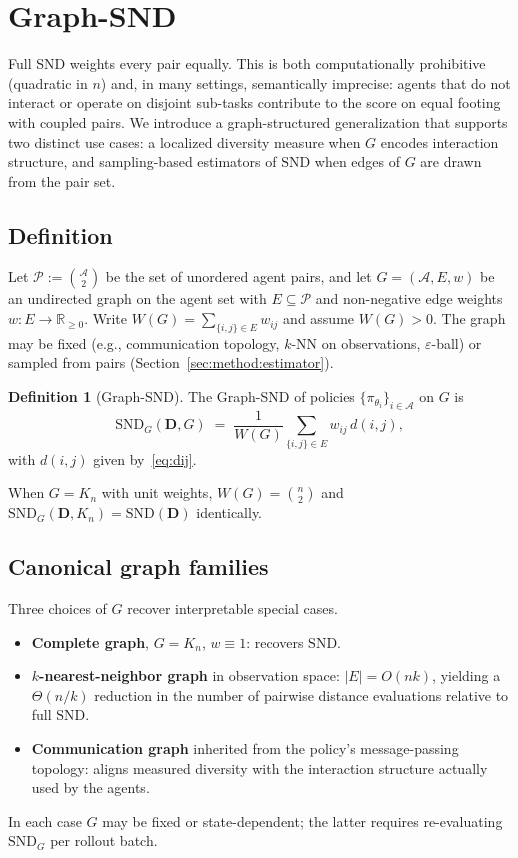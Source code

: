 \documentclass{article}
\theoremstyle{plain}
\theoremstyle{definition}
\newtheorem{definition}[theorem]{Definition}
\theoremstyle{remark}
\newcommand{\R}{\mathbb{R}}
\newcommand{\Agents}{\mathcal{A}}        %
\newcommand{\Pairs}{\mathcal{P}}         %
\newcommand{\policy}[1]{\pi_{\theta_{#1}}}
\newcommand{\SND}{\ensuremath{\mathrm{SND}}}
\newcommand{\SNDG}{\mathrm{SND}_{G}}
\begin{document}
\section{Graph-SND}
\label{sec:method}

Full SND weights every pair equally. This is both computationally
prohibitive (quadratic in $n$) and, in many settings, semantically
imprecise: agents that do not interact or operate on disjoint sub-tasks
contribute to the score on equal footing with coupled pairs. We introduce a
graph-structured generalization that supports two distinct use cases: a
localized diversity measure when $G$ encodes interaction structure, and
sampling-based estimators of $\SND$ when edges of $G$ are drawn from the
pair set.

\subsection{Definition}

Let $\Pairs := \binom{\Agents}{2}$ be the set of unordered agent pairs,
and let $G = (\Agents, E, w)$ be an undirected graph on the agent set with
$E \subseteq \Pairs$ and non-negative edge weights $w : E \to \R_{\geq 0}$.
Write $W(G) = \sum_{\{i,j\} \in E} w_{ij}$ and assume $W(G) > 0$. The graph
may be fixed (e.g., communication topology, $k$-NN on observations,
$\varepsilon$-ball) or sampled from pairs
(Section~\ref{sec:method:estimator}).

\begin{definition}[Graph-SND]
\label{def:graph-snd}
The Graph-SND of policies $\{\policy{i}\}_{i \in \Agents}$ on $G$ is
\begin{equation}
\label{eq:graph-snd}
\SNDG(\mathbf{D}, G) \;=\; \frac{1}{W(G)}
\sum_{\{i,j\} \in E} w_{ij} \, d(i,j),
\end{equation}
with $d(i,j)$ given by~\eqref{eq:dij}.
\end{definition}

When $G = K_n$ with unit weights, $W(G) = \binom{n}{2}$ and
$\SNDG(\mathbf{D}, K_n) = \SND(\mathbf{D})$ identically.

\subsection{Canonical graph families}

Three choices of $G$ recover interpretable special cases.
\begin{itemize}
  \item \textbf{Complete graph}, $G = K_n$, $w \equiv 1$: recovers $\SND$.
  \item \textbf{$k$-nearest-neighbor graph} in observation space:
  $|E| = O(nk)$, yielding a $\Theta(n/k)$ reduction in the number of
  pairwise distance evaluations relative to full $\SND$.
  \item \textbf{Communication graph} inherited from the policy's message-passing topology: aligns measured diversity with the interaction
  structure actually used by the agents.
\end{itemize}
In each case $G$ may be fixed or state-dependent; the latter requires
re-evaluating $\SNDG$ per rollout batch.
\end{document}
